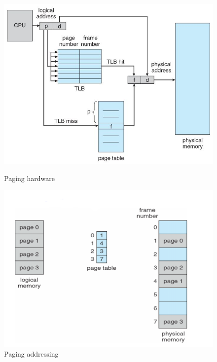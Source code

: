 \documentclass[../../lectures.tex]{subfiles}
\begin{document}
\begin{figure}[H]
\begin{minipage}[c]{0.6\linewidth}
\centering
\includegraphics[width=\textwidth]{images/paging-hardware.jpg}
\caption{Paging hardware}
\end{minipage}
\hspace{0.5cm}
\begin{minipage}[c]{0.4\linewidth}
\centering
\includegraphics[width=\textwidth]{images/paging-addressing.png}
\caption{Paging addressing}
\end{minipage}
\end{figure}
\end{document}
